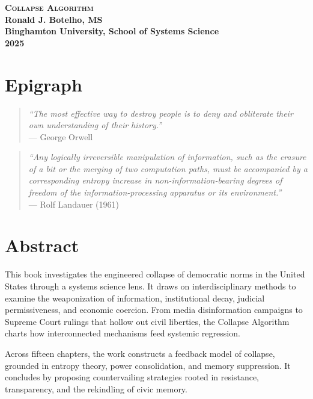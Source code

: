 \begin{flushleft}
\textbf{\LARGE{\textsc{Collapse Algorithm}}} \\
\textbf{\large{Ronald J. Botelho, MS}} \\
\textbf{\normalsize{Binghamton University, School of Systems Science}} \\
\textbf{\normalsize{2025}} \\
\end{flushleft}

\newpage

\section*{Epigraph}
\begin{quote}
\textit{``The most effective way to destroy people is to deny and obliterate their own understanding of their history.''} \\
\hfill --- George Orwell
\end{quote}

\vspace{1cm}

\begin{quote}
\textit{``Any logically irreversible manipulation of information, such as the erasure of a bit or the merging of two computation paths, must be accompanied by a corresponding entropy increase in non-information-bearing degrees of freedom of the information-processing apparatus or its environment.''} \\
\hfill --- Rolf Landauer (1961)
\end{quote}

\newpage

\section*{Abstract}
This book investigates the engineered collapse of democratic norms in the United States through a systems science lens. It draws on interdisciplinary methods to examine the weaponization of information, institutional decay, judicial permissiveness, and economic coercion. From media disinformation campaigns to Supreme Court rulings that hollow out civil liberties, the Collapse Algorithm charts how interconnected mechanisms feed systemic regression.

Across fifteen chapters, the work constructs a feedback model of collapse, grounded in entropy theory, power consolidation, and memory suppression. It concludes by proposing countervailing strategies rooted in resistance, transparency, and the rekindling of civic memory.

